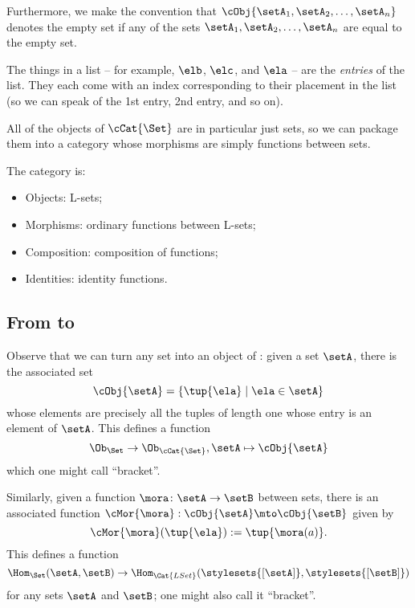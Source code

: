 Furthermore, we make the convention that $ \cObj{\setA_1, \setA_2, \dots, \setA_n}$ denotes the empty set if any of the sets $\setA_1, \setA_2, \dots , \setA_n$ are equal to the empty set.


The things in a list -- for example, $\elb$, $\elc$, and $\ela$ -- are the \emph{entries} of the list.
They each come with an index corresponding to their placement in the list (so we can speak of the 1st entry, 2nd entry, and so on).

All of the objects of $\cCat{\Set}$ are in particular just sets, so we can package them into a category whose morphisms are simply functions between sets.

\begin{ctdefinition}[\cCat{\Set}]
    The category \cCat{\Set} is:

    \begin{itemize}
        \item Objects: L-sets;
        \item Morphisms: ordinary functions between L-sets;
        \item Composition: composition of functions;
        \item Identities: identity functions.
    \end{itemize}
\end{ctdefinition}

\subsection{From \Set to \cCat{\Set}}

Observe that we can turn any set into an object of \cCat{\Set}: given a set $\setA$, there is the associated set
\begin{equation}
\cObj{\setA} = \{ \tup{\ela} \mid \ela \in \setA \}
\end{equation}
whose elements are precisely all the tuples of length one whose entry is an element of $\setA$. This defines a function
\begin{equation}
\Ob_{\Set} \to \Ob_{\cCat{\Set}}, \setA \mapsto \cObj{\setA}
\end{equation}
which one might call ``bracket''.

Similarly, given a function $\mora \colon \setA \to \setB$ between sets, there is an associated function $\cMor{ \mora }: \cObj{\setA} \mto \cObj{\setB}$ given by
\begin{equation}
\cMor{ \mora } ( \tup{ \ela }) := \tup{\mora(a)}.
\end{equation}
This defines a function
\begin{equation}
\Hom_{\Set}(\setA,\setB) \to \Hom_{\Cat{LSet}}(\stylesets{[\setA]},\stylesets{[\setB]})
\end{equation}
for any sets $\setA$ and $\setB$; one might also call it ``bracket''.





